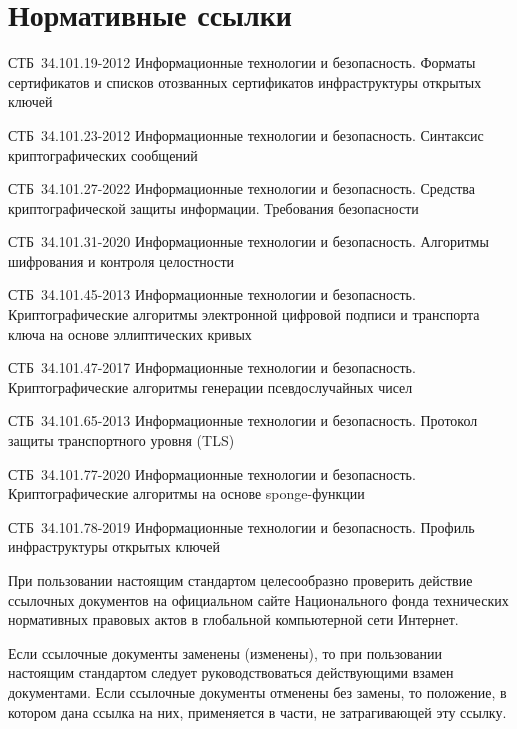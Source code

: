\chapter{Нормативные ссылки}\label{Refs}


СТБ~34.101.19-2012 Информационные технологии и безопасность. Форматы
сертификатов и списков отозванных сертификатов инфраструктуры открытых ключей

СТБ~34.101.23-2012 Информационные технологии и безопасность. Синтаксис
криптографических сообщений

СТБ~34.101.27-2022 Информационные технологии и безопасность. Средства
криптографической защиты информации. Требования безопасности

СТБ~34.101.31-2020 Информационные технологии и безопасность. Алгоритмы 
шифрования и контроля целостности  

СТБ~34.101.45-2013 Информационные технологии и безопасность. Криптографические
алгоритмы электронной цифровой подписи и транспорта ключа на основе
эллиптических кривых

СТБ~34.101.47-2017 Информационные технологии и безопасность. Криптографические
алгоритмы генерации псевдослучайных чисел

СТБ~34.101.65-2013 Информационные технологии и безопасность. Протокол защиты
транспортного уровня (TLS)


СТБ~34.101.77-2020 Информационные технологии и безопасность. Криптографические
алгоритмы на основе sponge-функции

СТБ~34.101.78-2019 Информационные технологии и безопасность. Профиль
инфраструктуры открытых ключей


\begin{note*}
При пользовании настоящим стандартом целесообразно проверить действие
ссылочных документов на официальном сайте Национального фонда
технических нормативных правовых актов в глобальной компьютерной сети Интернет.

Если ссылочные документы заменены (изменены), то при пользовании настоящим
стандартом следует руководствоваться действующими взамен документами. Если
ссылочные документы отменены без замены, то положение, в котором дана ссылка на
них, применяется в части, не затрагивающей эту ссылку.
\end{note*}

